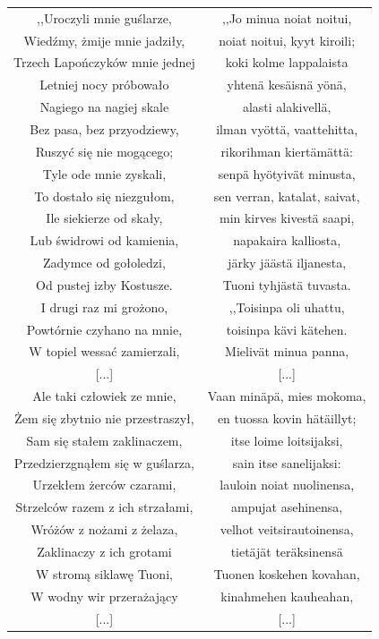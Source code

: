 \documentclass[11pt,a4paper,twoside]{report}
\begin{document}
{\centering
\small
\begin{longtable}{c c}
,,Uroczyli mnie guślarze, & ,,Jo minua noiat noitui, \\
Wiedźmy, żmije mnie jadziły, & noiat noitui, kyyt kiroili; \\
Trzech Lapończyków mnie jednej & koki kolme lappalaista \\
Letniej nocy próbowało & yhtenä kesäisnä yönä, \\
Nagiego na nagiej skale & alasti alakivellä, \\
Bez pasa, bez przyodziewy, & ilman vyöttä, vaattehitta, \\
Ruszyć się nie mogącego; & rikorihman kiertämättä: \\
Tyle ode mnie zyskali, & senpä hyötyivät minusta, \\
To dostało się niezgułom, & sen verran, katalat, saivat, \\
Ile siekierze od skały, & min kirves kivestä saapi, \\
Lub świdrowi od kamienia, & napakaira kalliosta, \\
Zadymce od gołoledzi, & järky jäästä iljanesta, \\
Od pustej izby Kostusze. & Tuoni tyhjästä tuvasta. \\
I drugi raz mi grożono, & ,,Toisinpa oli uhattu, \\
Powtórnie czyhano na mnie, & toisinpa kävi kätehen. \\
W topiel wessać zamierzali, & Mielivät minua panna, \\
{[...]} & {[...]} \\
Ale taki człowiek ze mnie, & Vaan minäpä, mies mokoma, \\
Żem się zbytnio nie przestraszył, & en tuossa kovin hätäillyt; \\
Sam się stałem zaklinaczem, & itse loime loitsijaksi, \\
Przedzierzgnąłem się w guślarza, & sain itse sanelijaksi: \\
Urzekłem żerców czarami, & lauloin noiat nuolinensa, \\
Strzelców razem z ich strzałami, & ampujat asehinensa, \\
Wróżów z nożami z żelaza, & velhot veitsirautoinensa, \\
Zaklinaczy z ich grotami & tietäjät teräksinensä \\
W stromą siklawę Tuoni, & Tuonen koskehen kovahan, \\
W wodny wir przerażający & kinahmehen kauheahan, \\
{[...]} & {[...]} \\
\end{longtable}
}
\end{document}
